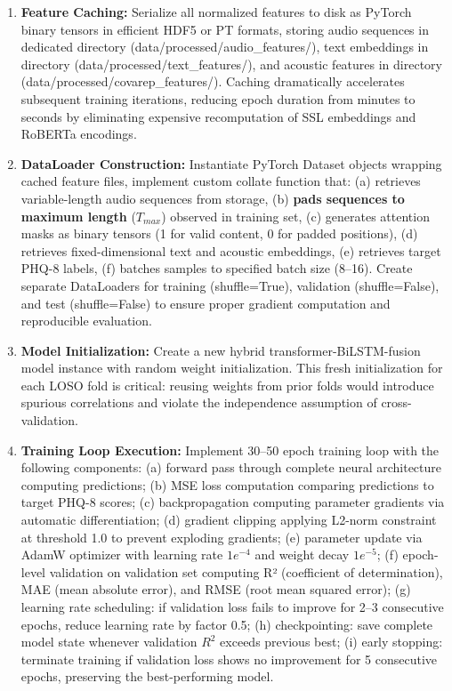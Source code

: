 \documentclass[12pt]{article}
\begin{document}
\begin{enumerate}
		\item \textbf{Feature Caching:} Serialize all normalized features to disk as PyTorch binary tensors in efficient HDF5 or PT formats, storing audio sequences in dedicated directory (data/processed/audio\_features/), text embeddings in directory (data/processed/text\_features/), and acoustic features in directory (data/processed/covarep\_features/). Caching dramatically accelerates subsequent training iterations, reducing epoch duration from minutes to seconds by eliminating expensive recomputation of SSL embeddings and RoBERTa encodings.

		\item \textbf{DataLoader Construction:} Instantiate PyTorch Dataset objects wrapping cached feature files, implement custom collate function that: (a) retrieves variable-length audio sequences from storage, (b) \textbf{pads sequences to maximum length} ($T_{max}$) observed in training set, (c) generates attention masks as binary tensors (1 for valid content, 0 for padded positions), (d) retrieves fixed-dimensional text and acoustic embeddings, (e) retrieves target PHQ-8 labels, (f) batches samples to specified batch size (8--16). Create separate DataLoaders for training (shuffle=True), validation (shuffle=False), and test (shuffle=False) to ensure proper gradient computation and reproducible evaluation.

		\item \textbf{Model Initialization:} Create a new hybrid transformer-BiLSTM-fusion model instance with random weight initialization. This fresh initialization for each LOSO fold is critical: reusing weights from prior folds would introduce spurious correlations and violate the independence assumption of cross-validation.

		\item \textbf{Training Loop Execution:} Implement 30--50 epoch training loop with the following components: (a) forward pass through complete neural architecture computing predictions; (b) MSE loss computation comparing predictions to target PHQ-8 scores; (c) backpropagation computing parameter gradients via automatic differentiation; (d) gradient clipping applying L2-norm constraint at threshold 1.0 to prevent exploding gradients; (e) parameter update via AdamW optimizer with learning rate $1e^{-4}$ and weight decay $1e^{-5}$; (f) epoch-level validation on validation set computing R² (coefficient of determination), MAE (mean absolute error), and RMSE (root mean squared error); (g) learning rate scheduling: if validation loss fails to improve for 2--3 consecutive epochs, reduce learning rate by factor 0.5; (h) checkpointing: save complete model state whenever validation $R^2$ exceeds previous best; (i) early stopping: terminate training if validation loss shows no improvement for 5 consecutive epochs, preserving the best-performing model.


\end{enumerate}
\end{document}
